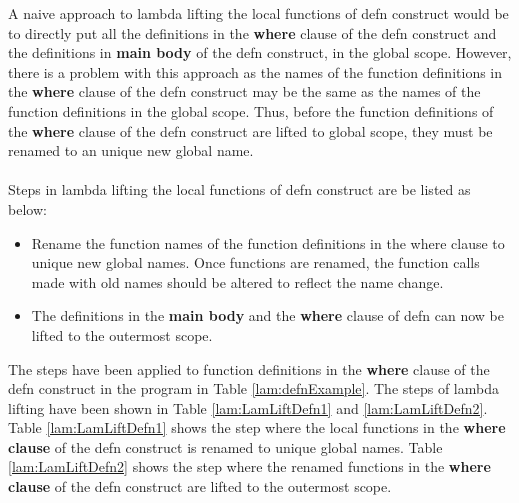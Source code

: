 \documentclass[11pt]{article}
\begin{document}
A naive approach to lambda lifting the local functions of {\sf defn} construct would be to directly put all the definitions in the {\bf where} clause of the {\sf defn} construct  and the definitions in {\bf main body} of the {\sf defn} construct, in the global scope. However, there is a problem with this approach as the names of the function definitions in the {\bf where} clause of the {\sf defn} construct may be the same as the names of the function definitions in the global scope. Thus, before the function definitions of the {\bf where} clause of the {\sf defn} construct are lifted to global scope, they must be renamed to an unique new global name.
~~\\~~\\ 
Steps in lambda lifting the local functions of {\sf defn} construct are be listed as below:
\begin{itemize}
  \item Rename the function names of the function definitions in the {\sf where} clause to unique new global names. Once functions are renamed, the function calls made with old names should be altered to reflect the name change.
  \item The definitions in the {\bf main body} and the {\bf where} clause of defn can now be lifted to the outermost scope.
\end{itemize}
The steps have been applied to function definitions in the {\bf where} clause of the {\sf defn} construct in the program in Table \ref {lam:defnExample}. The steps of lambda lifting have been shown in Table \ref {lam:LamLiftDefn1} and \ref {lam:LamLiftDefn2}. Table \ref {lam:LamLiftDefn1} shows the step where the local functions in the 
{\bf where clause} of the {\sf defn } construct is renamed to unique global names. Table \ref {lam:LamLiftDefn2} shows the step where the renamed functions in the 
{\bf where clause} of the {\sf defn } construct are lifted to the outermost scope.
\end{document}

